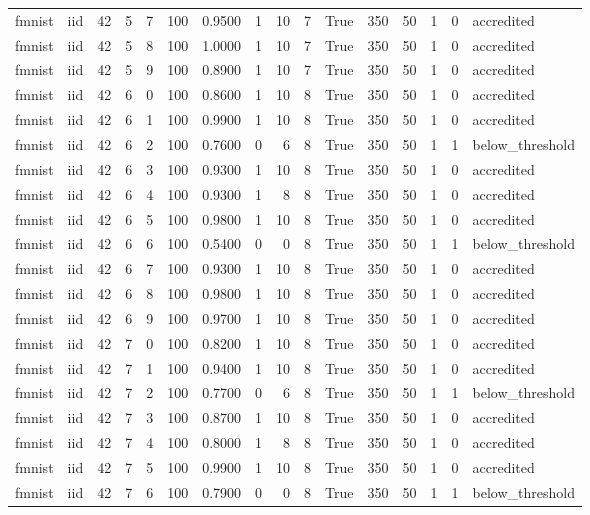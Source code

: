 \begin{tabular}{llrrrrrrrrrrrrrl}
fmnist & iid & 42 & 5 & 7 & 100 & 0.9500 & 1 & 10 & 7 & True & 350 & 50 & 1 & 0 & accredited \\
fmnist & iid & 42 & 5 & 8 & 100 & 1.0000 & 1 & 10 & 7 & True & 350 & 50 & 1 & 0 & accredited \\
fmnist & iid & 42 & 5 & 9 & 100 & 0.8900 & 1 & 10 & 7 & True & 350 & 50 & 1 & 0 & accredited \\
fmnist & iid & 42 & 6 & 0 & 100 & 0.8600 & 1 & 10 & 8 & True & 350 & 50 & 1 & 0 & accredited \\
fmnist & iid & 42 & 6 & 1 & 100 & 0.9900 & 1 & 10 & 8 & True & 350 & 50 & 1 & 0 & accredited \\
fmnist & iid & 42 & 6 & 2 & 100 & 0.7600 & 0 & 6 & 8 & True & 350 & 50 & 1 & 1 & below\_threshold \\
fmnist & iid & 42 & 6 & 3 & 100 & 0.9300 & 1 & 10 & 8 & True & 350 & 50 & 1 & 0 & accredited \\
fmnist & iid & 42 & 6 & 4 & 100 & 0.9300 & 1 & 8 & 8 & True & 350 & 50 & 1 & 0 & accredited \\
fmnist & iid & 42 & 6 & 5 & 100 & 0.9800 & 1 & 10 & 8 & True & 350 & 50 & 1 & 0 & accredited \\
fmnist & iid & 42 & 6 & 6 & 100 & 0.5400 & 0 & 0 & 8 & True & 350 & 50 & 1 & 1 & below\_threshold \\
fmnist & iid & 42 & 6 & 7 & 100 & 0.9300 & 1 & 10 & 8 & True & 350 & 50 & 1 & 0 & accredited \\
fmnist & iid & 42 & 6 & 8 & 100 & 0.9800 & 1 & 10 & 8 & True & 350 & 50 & 1 & 0 & accredited \\
fmnist & iid & 42 & 6 & 9 & 100 & 0.9700 & 1 & 10 & 8 & True & 350 & 50 & 1 & 0 & accredited \\
fmnist & iid & 42 & 7 & 0 & 100 & 0.8200 & 1 & 10 & 8 & True & 350 & 50 & 1 & 0 & accredited \\
fmnist & iid & 42 & 7 & 1 & 100 & 0.9400 & 1 & 10 & 8 & True & 350 & 50 & 1 & 0 & accredited \\
fmnist & iid & 42 & 7 & 2 & 100 & 0.7700 & 0 & 6 & 8 & True & 350 & 50 & 1 & 1 & below\_threshold \\
fmnist & iid & 42 & 7 & 3 & 100 & 0.8700 & 1 & 10 & 8 & True & 350 & 50 & 1 & 0 & accredited \\
fmnist & iid & 42 & 7 & 4 & 100 & 0.8000 & 1 & 8 & 8 & True & 350 & 50 & 1 & 0 & accredited \\
fmnist & iid & 42 & 7 & 5 & 100 & 0.9900 & 1 & 10 & 8 & True & 350 & 50 & 1 & 0 & accredited \\
fmnist & iid & 42 & 7 & 6 & 100 & 0.7900 & 0 & 0 & 8 & True & 350 & 50 & 1 & 1 & below\_threshold \\

\end{tabular}
